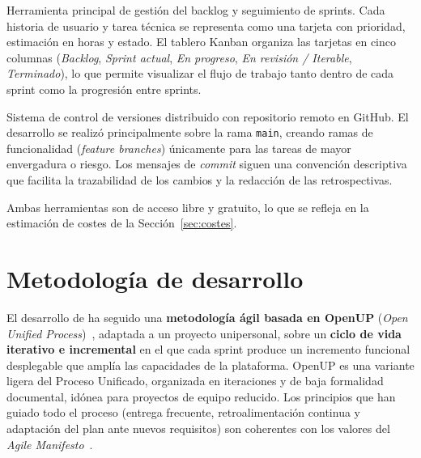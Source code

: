 \begin{definitionlist}
  \item[Trello]  Herramienta principal de gestión del backlog y
    seguimiento de sprints.  Cada historia de usuario y tarea técnica
    se representa como una tarjeta con prioridad, estimación en horas
    y estado.  El tablero Kanban organiza las tarjetas en cinco
    columnas (\textit{Backlog}, \textit{Sprint actual},
    \textit{En progreso}, \textit{En revisión / Iterable},
    \textit{Terminado}), lo que permite visualizar
    el flujo de trabajo tanto dentro de cada sprint como la progresión
    entre sprints.

  \item[Git + GitHub]  Sistema de control de versiones distribuido con
    repositorio remoto en GitHub.  El desarrollo se realizó
    principalmente sobre la rama \texttt{main}, creando ramas de
    funcionalidad (\emph{feature branches}) únicamente para las tareas
    de mayor envergadura o riesgo.  Los mensajes de \emph{commit}
    siguen una convención descriptiva que facilita la trazabilidad de
    los cambios y la redacción de las retrospectivas.
\end{definitionlist}

Ambas herramientas son de acceso libre y gratuito, lo que se refleja
en la estimación de costes de la Sección~\ref{sec:costes}.


\section{Metodología de desarrollo}
\label{sec:metodologia-desarrollo}

El desarrollo de \dataqual ha seguido una \textbf{metodología ágil basada en
OpenUP} (\emph{Open Unified Process})~\citep{openup}, adaptada a un proyecto
unipersonal, sobre un \textbf{ciclo de vida iterativo e incremental} en el que
cada sprint produce un incremento funcional desplegable que amplía las
capacidades de la plataforma.  OpenUP es una variante ligera del Proceso
Unificado, organizada en iteraciones y de baja formalidad documental, idónea
para proyectos de equipo reducido.  Los principios que han guiado todo el
proceso (entrega frecuente, retroalimentación continua y adaptación del plan
ante nuevos requisitos) son coherentes con los valores del \emph{Agile
Manifesto}~\citep{agilemanifesto}.

